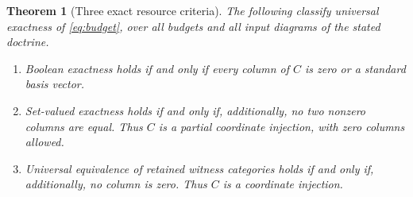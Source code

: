 \documentclass[11pt]{article}
\newtheorem{theorem}{Theorem}
\theoremstyle{definition}\newtheorem{definition}[theorem]{Definition}
\theoremstyle{remark}\newtheorem{remark}[theorem]{Remark}
\begin{document}
\begin{theorem}[Three exact resource criteria]\label{thm:matrix}
The following classify universal exactness of \eqref{eq:budget}, over
all budgets and all input diagrams of the stated doctrine.
\begin{enumerate}[label=(\roman*)]
\item Boolean exactness holds if and only if every column of $C$ is zero
or a standard basis vector.
\item Set-valued exactness holds if and only if, additionally, no two
nonzero columns are equal. Thus $C$ is a partial coordinate injection,
with zero columns allowed.
\item Universal equivalence of retained witness categories holds if and
only if, additionally, no column is zero. Thus $C$ is a coordinate injection.
\end{enumerate}
\end{theorem}
\end{document}
